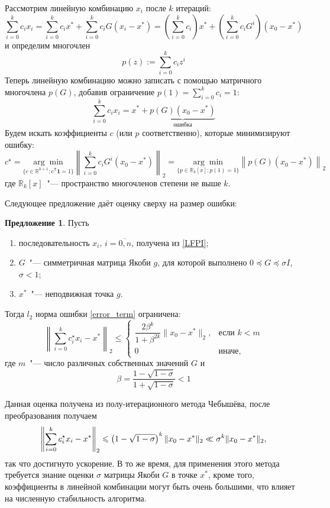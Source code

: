 \documentclass[12pt]{article}
\theoremstyle{definition}
\newtheorem{Prop}{Предложение}
\numberwithin{Def}{section}
\numberwithin{Th}{section}
\numberwithin{Prop}{section}
\numberwithin{St}{section}
\numberwithin{Cor}{section}
\begin{document}
Рассмотрим линейную комбинацию $x_i$ после $k$ итераций:
$$
\sum_{i=0}^k c_ix_i=\sum_{i=0}^k c_ix^*+\sum_{i=0}^k c_iG(x_i-x^*)=
\left(\sum_{i=0}^k c_i\right)x^*+\left(\sum_{i=0}^k c_i G^i\right)(x_0-x^*)
$$
и определим многочлен
$$
p(z):=\sum_{i=0}^k c_iz^i
$$
Теперь линейную комбинацию можно записать с помощью матричного многочлена $p(G)$,
добавив ограничение $p(1)=\sum_{i=0}^kc_i=1$:
\begin{equation}\label{error_term}
\sum_{i=0}^kc_ix_i=x^*+\underbrace{p(G)(x_0-x^*)}_{\text{ошибка}}
\end{equation}
Будем искать коэффициенты $c$ (или $p$ соответственно), которые минимизируют
ошибку:
$$
c^\star=\underset{\{c\in\mathbb{R}^{k+1}:c^\mathsf{T}\mathbf{1}=1\}}
{\arg\min}\left\|\sum_{i=0}^kc_iG^i(x_0-x^*)\right\|_2=
\underset{\{p\in\mathbb{R}_k[x]:p(1)=1\}}
{\arg\min}\left\|p(G)(x_0-x^*)\right\|_2
$$
где $\mathbb{R}_k[x]$~"--- пространство многочленов степени не выше $k$.

Следующее предложение даёт оценку сверху на размер ошибки:

\begin{Prop}\label{prop_bound}
	Пусть
	\begin{enumerate}
		\item последовательность $x_i,\,i=\overline{0,n}$, получена из
		\eqref{LFPI};
		\item $G$~"--- симметричная матрица Якоби $g$, для которой
		выполнено ${0\preceq G\preceq\sigma I}$, $\sigma<1$;
		\item $x^*$~"--- неподвижная точка $g$.
	\end{enumerate}
	Тогда $l_2$ норма ошибки \eqref{error_term} ограничена:
	\begin{equation}
		\left\|\sum_{i=0}^kc_i^\star x_i-x^*\right\|_2\leqslant\begin{cases}
		\dfrac{2\beta^k}{1+\beta^{2k}}\|x_0-x^*\|_2,&\text{если }k<m \\
		0&\text{иначе,}
	\end{cases}
	\end{equation}
	где $m$~"--- число различных собственных значений $G$ и
	$$
	\beta=\dfrac{1-\sqrt{1-\sigma}}{1+\sqrt{1-\sigma}}<1
	$$
\end{Prop}

Данная оценка получена из полу-итерационного метода Чебышёва,
после преобразования получаем
$$
\left\|\sum_{i=0}^kc_i^\star x_i-x^*\right\|_2\leqslant
\left(1-\sqrt{1-\sigma}\right)^k\|x_0-x^*\|_2\ll\sigma^k\|x_0-x^*\|_2,
$$
так что достигнуто ускорение. В то же время, для применения этого метода
требуется знание оценки $\sigma$ матрицы Якоби $G$ в точке $x^*$, кроме того,
коэффициенты в линейной комбинации могут быть очень большими, что влияет
на численную стабильность алгоритма.
\end{document}
